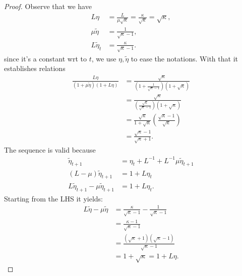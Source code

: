 \documentclass[12pt]{article}
\begin{document}
        \begin{proof}
            Observe that we have 
            \begin{align*}
                L\eta &= \frac{L}{\mu \sqrt{\kappa}} = \frac{\kappa}{\sqrt{\kappa}} = \sqrt{\kappa}, 
                \\
                \mu \tilde \eta &= 
                \frac{1}{\sqrt{\kappa} - 1}, 
                \\
                L\tilde \eta_t &= 
                \frac{\kappa}{\sqrt{\kappa} - 1}. 
            \end{align*}
            since it's a constant wrt to $t$, we use $\eta, \tilde \eta$ to ease the notations. 
            With that it establishes relations
            \begin{align*}
                \frac{L\eta }{(1 + \mu \tilde \eta)(1 + L\eta)}
                &= 
                \frac{\sqrt{\kappa}}{
                    \left(
                        1 + \frac{1}{\sqrt{\kappa} - 1}
                    \right)
                    \left(
                        1 + \sqrt{\kappa}
                    \right)
                }
                \\
                &= \frac{\sqrt{\kappa}}{
                    \left(
                        \frac{\sqrt{\kappa}}{\sqrt{\kappa} - 1}
                    \right)(1 + \sqrt{\kappa})
                }
                \\
                &=
                \frac{\sqrt{\kappa}}{1 + \sqrt{\kappa}}\left(
                    \frac{\sqrt{\kappa} - 1}{\sqrt{\kappa}}
                \right)
                \\
                &= 
                \frac{\sqrt{\kappa} - 1}{\sqrt{\kappa} + 1}. 
            \end{align*}
            The sequence is valid because 
            \begin{align*}
                \tilde \eta_{t + 1} 
                &= \eta_t + L^{-1} + L^{-1} \mu \tilde \eta_{t + 1}
                \\
                (L - \mu)\tilde \eta_{t + 1}
                &= 
                1 + L \eta_t 
                \\
                L \tilde \eta_{t + 1} - 
                \mu \tilde \eta_{t + 1}
                &= 1 + L \eta_t. 
            \end{align*}
            Starting from the LHS it yields: 
            \begin{align*}
                L\tilde \eta - \mu \tilde \eta 
                &= \frac{\kappa}{\sqrt{\kappa} - 1} - 
                \frac{1}{\sqrt{\kappa} - 1}
                \\
                &= 
                \frac{\kappa - 1}{\sqrt{\kappa} - 1}
                \\
                &= 
                \frac{(\sqrt{\kappa} + 1)(\sqrt{\kappa} - 1)}{\sqrt{\kappa} - 1}
                \\
                &= 1 + \sqrt{\kappa} = 1 + L \eta. 
            \end{align*}
        \end{proof}
\end{document}
